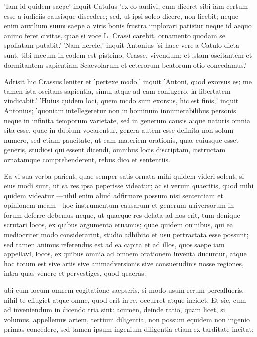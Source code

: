  'Iam id quidem saepe' inquit Catulus 'ex eo audivi, cum diceret sibi iam certum esse a iudiciis causisque discedere; sed, ut ipsi soleo dicere, non licebit; neque enim auxilium suum saepe a viris bonis frustra implorari patietur neque id aequo animo feret civitas, quae si voce L. Crassi carebit, ornamento quodam se spoliatam putabit.' 'Nam hercle,' inquit Antonius 'si haec vere a Catulo dicta sunt, tibi mecum in eodem est pistrino, Crasse, vivendum; et istam oscitantem et dormitantem sapientiam Scaevolarum et ceterorum beatorum otio concedamus.'

 Adrisit hic Crassus leniter et 'pertexe modo,' inquit 'Antoni, quod exorsus es; me tamen ista oscitans sapientia, simul atque ad eam confugero, in libertatem vindicabit.' 'Huius quidem loci, quem modo sum exorsus, hic est finis,' inquit Antonius; 'quoniam intellegeretur non in hominum innumerabilibus personis neque in infinita temporum varietate, sed in generum causis atque naturis omnia sita esse, quae in dubium vocarentur, genera autem esse definita non solum numero, sed etiam paucitate, ut eam materiem orationis, quae cuiusque esset generis, studiosi qui essent dicendi, omnibus locis discriptam, instructam ornatamque comprehenderent, rebus dico et sententiis.

 Ea vi sua verba parient, quae semper satis ornata mihi quidem videri solent, si eius modi sunt, ut ea res ipsa peperisse videatur; ac si verum quaeritis, quod mihi quidem videatur —nihil enim aliud adfirmare possum nisi sententiam et opinionem meam—hoc instrumentum causarum et generum universorum in forum deferre debemus neque, ut quaeque res delata ad nos erit, tum denique scrutari locos, ex quibus argumenta eruamus; quae quidem omnibus, qui ea mediocriter modo considerarint, studio adhibito et usu pertractata esse possunt; sed tamen animus referendus est ad ea capita et ad illos, quos saepe iam appellavi, locos, ex quibus omnia ad omnem orationem inventa ducuntur, atque hoc totum est sive artis sive animadversionis sive consuetudinis nosse regiones, intra quas venere et pervestiges, quod quaeras:

 ubi eum locum omnem cogitatione saepseris, si modo usum rerum percallueris, nihil te effugiet atque omne, quod erit in re, occurret atque incidet. Et sic, cum ad inveniendum in dicendo tria sint: acumen, deinde ratio, quam licet, si volumus, appellemus artem, tertium diligentia, non possum equidem non ingenio primas concedere, sed tamen ipsum ingenium diligentia etiam ex tarditate incitat;

